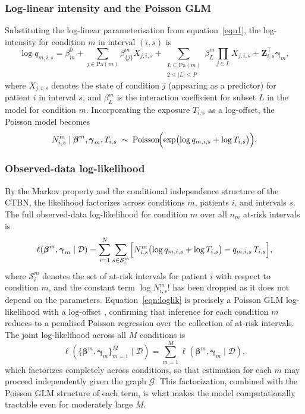\documentclass[12pt]{article}
\begin{document}
\subsubsection{Log-linear intensity and the Poisson GLM} Substituting the log-linear parameterisation from equation~\eqref{eqn1}, the log-intensity for condition $m$ in interval $(i,s)$ is
\begin{equation}
\log q_{m,i,s} = \beta^{0}_m + \sum_{j \in \mathrm{Pa}(m)} \beta^m_{\{j\}} X_{j,i,s} + \sum_{\substack{L \subseteq \mathrm{Pa}(m) \\ 2 \leq |L| \leq P}} \beta^m_L \prod_{j \in L} X_{j,i,s} + \mathbf{Z}_{i,s}^\top \boldsymbol{\gamma}_m,
\end{equation}
where $X_{j,i,s}$ denotes the state of condition $j$ (appearing as a predictor) for patient $i$ in interval $s$, and $\beta^m_L$ is the interaction coefficient for subset $L$ in the model for condition $m$. Incorporating the exposure $T_{i,s}$ as a log-offset, the Poisson model becomes
\[
N^m_{i,s} \mid \boldsymbol{\beta}^m, \boldsymbol{\gamma}_m, T_{i,s} \;\sim\; \mathrm{Poisson}\!\Bigl(\exp\bigl(\log q_{m,i,s} + \log T_{i,s}\bigr)\Bigr).
\]

\subsubsection{Observed-data log-likelihood} By the Markov property and the conditional independence structure of the CTBN, the likelihood factorizes across conditions $m$, patients $i$, and intervals $s$. The full observed-data log-likelihood for condition $m$ over all $n_m$ at-risk intervals is
\begin{equation}\label{eqn:loglik}
\ell(\boldsymbol{\beta}^m, \boldsymbol{\gamma}_m \mid \mathcal{D}) = \sum_{i=1}^{N} \sum_{s \in \mathcal{S}^m_i} \Bigl[ N^m_{i,s} \bigl(\log q_{m,i,s} + \log T_{i,s}\bigr) - q_{m,i,s}\, T_{i,s} \Bigr],
\end{equation}
where $\mathcal{S}^m_i$ denotes the set of at-risk intervals for patient $i$ with respect to condition $m$, and the constant term $\log N^m_{i,s}!$ has been dropped as it does not depend on the parameters. Equation~\eqref{eqn:loglik} is precisely a Poisson GLM log-likelihood with a log-offset \citep{McCullaghNelder1989}, confirming that inference for each condition $m$ reduces to a penalised Poisson regression over the collection of at-risk intervals. The joint log-likelihood across all $M$ conditions is
\[
\ell(\{\boldsymbol{\beta}^m, \boldsymbol{\gamma}_m\}_{m=1}^M \mid \mathcal{D}) = \sum_{m=1}^{M} \ell(\boldsymbol{\beta}^m, \boldsymbol{\gamma}_m \mid \mathcal{D}),
\]
which factorizes completely across conditions, so that estimation for each $m$ may proceed independently given the graph $\mathcal{G}$. This factorization, combined with the Poisson GLM structure of each term, is what makes the model computationally tractable even for moderately large $M$.
\end{document}
